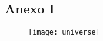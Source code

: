   \begin{snugshade}
  \section*{Anexo I} %
  \end{snugshade}
  
  \begin{figure}[h]
\texttt{[image: universe]}
\end{figure}